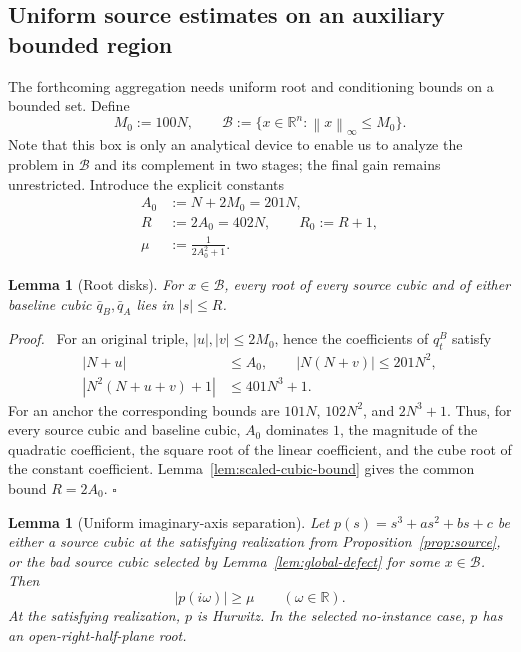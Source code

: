 \documentclass[final,5p,times,twocolumn]{elsarticle}
\newcommand{\R}{\mathbb R}
\newcommand{\abs}[1]{\left|#1\right|}
\newcommand{\norm}[1]{\left\|#1\right\|}
\newtheorem{lemma}[theorem]{Lemma}
\newenvironment{proof}[1][Proof]
  {\par\smallskip\noindent\textit{#1.}\ }
  {\hfill$\square$\par\smallskip}
\begin{document}
\subsection{Uniform source estimates on an auxiliary bounded region}

The forthcoming aggregation needs uniform root and conditioning bounds on a bounded set. Define
\begin{equation}\label{eq:M0}
M_0:=100N,
\qquad
\mathcal B:=\{x\in\R^n:\norm{x}_\infty\le M_0\}.
\end{equation}
Note that this box is only an analytical device to enable us to analyze the problem in $\mathcal B$ and its complement in two stages; the final gain remains unrestricted. Introduce the explicit constants
\begin{align}
A_0&:=N+2M_0=201N,\label{eq:A0}\\
R&:=2A_0=402N,\qquad R_0:=R+1,\label{eq:R-R0}\\
\mu&:=\frac{1}{2A_0^2+1}.\label{eq:mu}
\end{align}

\begin{lemma}[Root disks]\label{lem:root-disks}
For $x\in\mathcal B$, every root of every source cubic and of either baseline cubic $\bar q_B,\bar q_A$ lies in $\abs s\le R$.
\end{lemma}

\begin{proof}
For an original triple, $|u|,|v|\le2M_0$, hence the coefficients of $q_t^B$ satisfy
\[
\begin{aligned}
|N+u|&\le A_0,\qquad |N(N+v)|\le201N^2,\\
|N^2(N+u+v)+1|&\le401N^3+1.
\end{aligned}
\]
For an anchor the corresponding bounds are $101N$, $102N^2$, and $2N^3+1$. Thus, for every source cubic and baseline cubic, $A_0$ dominates $1$, the magnitude of the quadratic coefficient, the square root of the linear coefficient, and the cube root of the constant coefficient. Lemma~\ref{lem:scaled-cubic-bound} gives the common bound $R=2A_0$.
\end{proof}

\begin{lemma}[Uniform imaginary-axis separation]\label{lem:imag-gap}
Let $p(s)=s^3+as^2+bs+c$ be either a source cubic at the satisfying realization from Proposition~\ref{prop:source}, or the bad source cubic selected by Lemma~\ref{lem:global-defect} for some $x\in\mathcal B$. Then
\[
\abs{p(i\omega)}\ge\mu
\qquad(\omega\in\R).
\]
At the satisfying realization, $p$ is Hurwitz. In the selected no-instance case, $p$ has an open-right-half-plane root.
\end{lemma}
\end{document}
